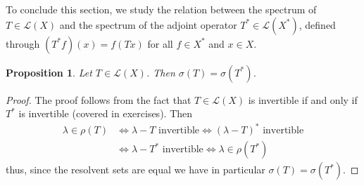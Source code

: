 \documentclass[11pt,a4paper]{article}
\newtheorem{prop}{Proposition}[section]
\theoremstyle{definition}
\begin{document}
\noindent To conclude this section, we study the relation between the spectrum of $T \in \mathcal{L}(X)$ and the spectrum of the adjoint operator $T^* \in \mathcal{L}(X^*)$, defined through $(T^*f)(x) = f(Tx)$ for all $f \in X^*$ and $x \in X$. 
\begin{prop} Let $T \in \mathcal{L}(X)$. Then $\sigma(T)= \sigma(T^*)$. 
\end{prop}
\begin{proof}
The proof follows from the fact that $T \in \mathcal{L}(X)$ is invertible if and only if $T^*$ is invertible (covered in exercises). Then 
\begin{align*}
\lambda \in \rho (T) &\iff \lambda-T \text{ invertible} \iff ( \lambda- T)^* \text{ invertible} \\
& \iff \lambda-T^* \text{ invertible} \iff \lambda \in \rho(T^*)
\end{align*}
thus, since the resolvent sets are equal we have in particular $\sigma(T)= \sigma(T^*)$. 
\end{proof}
\newpage
\end{document}
